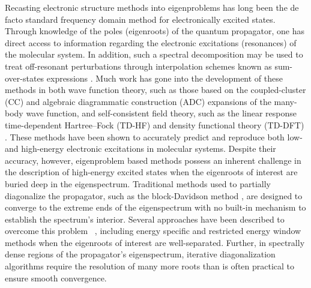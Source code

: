 Recasting electronic structure methods into eigenproblems has long been the de facto standard frequency domain method for electronically excited states. Through knowledge of the poles (eigenroots) of the quantum propagator, one has direct access to information regarding the electronic excitations (resonances) of the molecular system. In addition, such a spectral decomposition may be used to treat off-resonant perturbations through interpolation schemes known as sum-over-states expressions \cite{Yeager84_33}.
Much work has gone into the development of these methods in both wave function theory, such as those based on
the 
coupled-cluster (CC) \cite{olje1988,Monkhorst77_421,Jorgensen90_3333,Bartlett93_7029,Bartlett93_414} 
and algebraic diagrammatic construction (ADC) \cite{Dreuw14_4583,Dreuw14_1900} 
expansions of the many-body wave function,
and self-consistent field theory, such as the linear response time-dependent Hartree--Fock (TD-HF) \cite{Hattig98_1,Ring_book,Jorgensen_book,Rowe68_153} and density functional theory
(TD-DFT) \cite{Casida95_book,HeadGordon05_4009}. These methods have been shown to accurately predict and reproduce both low- \cite{Ruud12_543,Bartlett09_Book} and high-energy \cite{Li11_3540,Li15_2994,Li15_4146,DeSimone03_115,Neese07_2783,Asmuruf10_12024,Govind12_3284} electronic excitations in molecular systems.  Despite
their accuracy, however, eigenproblem based methods possess an inherent challenge in the
description of high-energy excited states when the eigenroots of interest
are buried deep in the eigenspectrum.  Traditional methods used to partially
diagonalize the propagator, such as the
block-Davidson method \cite{Davidson75_87,Scott86_817,Morgan92_287}, are designed to converge to the extreme ends of the
eigenspectrum with no built-in mechanism to establish the spectrum's interior. 
Several approaches have been described to overcome this problem~ \cite{zuev_etal2015}, including
energy specific \cite{Li11_3540,Li15_4146} and
restricted energy window methods \cite{DeSimone03_115,Neese07_2783,Asmuruf10_12024} when the eigenroots of interest are well-separated. Further, in spectrally dense regions of the propagator's eigenspectrum, iterative diagonalization algorithms require the resolution of many more roots than is often practical to ensure smooth convergence.

